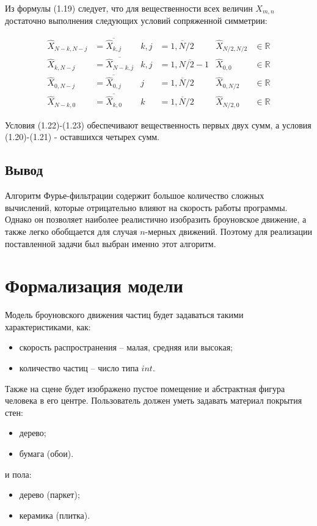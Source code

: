 Из формулы (1.19) следует, что для вещественности всех величин $X_{m,n}$ достаточно выполнения следующих условий сопряженной симметрии:

\begin{align}
	\hat{X}_{N-k,N-j} &= \overline{\hat{X}_{k,j}} &k,j &= \overline{1,N/2} &\hat{X}_{N/2,N/2} & \in \mathbb{R}\\
	\hat{X}_{k,N-j} &= \overline{\hat{X}_{N-k,j}} &k,j &= \overline{1,N/2-1} &\hat{X}_{0,0} & \in \mathbb{R}\\
	\hat{X}_{0,N-j} &= \overline{\hat{X}_{0,j}} &j &= \overline{1,N/2} &\hat{X}_{0,N/2} & \in \mathbb{R}\\
	\hat{X}_{N-k,0} &= \overline{\hat{X}_{k,0}} &k &= \overline{1,N/2} &\hat{X}_{N/2,0} & \in \mathbb{R}
\end{align}

Условия (1.22)-(1.23) обеспечивают вещественность первых двух сумм, а условия (1.20)-(1.21) - оставшихся четырех сумм.

\subsection*{Вывод}

Алгоритм Фурье-фильтрации содержит большое количество сложных вычислений, которые отрицательно влияют на скорость работы программы. Однако он позволяет наиболее реалистично изобразить броуновское движение, а также легко обобщается для случая $n$-мерных движений. Поэтому для реализации поставленной задачи был выбран именно этот алгоритм.

\section{Формализация модели}
Модель броуновского движения частиц будет задаваться такими характеристиками, как:
\begin{itemize} 
	\item скорость распространения -- малая, средняя или высокая;
	\item количество частиц -- число типа $int$.
\end{itemize}

Также на сцене будет изображено пустое помещение и абстрактная фигура человека в его центре. Пользователь должен уметь задавать материал покрытия стен:
\begin{itemize} 
	\item дерево;
	\item бумага (обои).
\end{itemize}
и пола:
\begin{itemize} 
	\item дерево (паркет);
	\item керамика (плитка).
\end{itemize}


